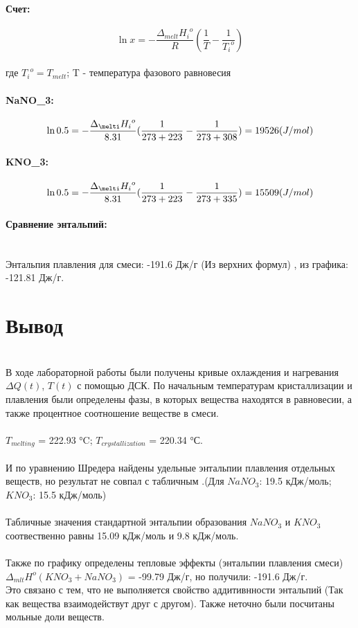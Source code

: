 \documentclass[a4paper,12pt]{article} %
\begin{document}
\paragraph{Счет:}
\begin{equation}
    \ln{x} = -\frac{\Delta_{melt} {H_i}^{o}}{R}(\frac{1}{T}-\frac{1}{{T_i}^{o}}) 
\end{equation}
\\где ${T_i}^{o} = T_{melt}$; T - температура фазового равновесия

\paragraph{{NaNO}_3:}
\begin{equation}
    \ln{0.5} = -\frac{\Delta_{\melti}{H_i}^{o}}{8.31}(\frac{1}{273+223} - \frac{1}{273+308}) = 19526 (J/mol) 
\end{equation}

\paragraph{{KNO}_3:}
\begin{equation}
        \ln{0.5} = -\frac{\Delta_{\melti}{H_i}^{o}}{8.31}(\frac{1}{273+223} - \frac{1}{273+335}) = 15509 (J/mol)
\end{equation}
\paragraph{Сравнение энтальпий:}
\quad \\ Энтальпия плавления для смеси: -191.6 Дж/г (Из верхних формул) , из графика: -121.81 Дж/г.
\section{Вывод}
\quad \\ В ходе лабораторной работы были получены кривые охлаждения и нагревания $\Delta Q(t)$, $T(t)$ с помощью ДСК. По начальным температурам кристаллизации и плавления были определены фазы, в которых вещества находятся в равновесии, а также процентное соотношение веществе в смеси.
\\
\quad \\ $T_{melting}$ = 222.93 °C; $T_{crystallization} $ =  220.34 °С. 
\\
\quad \\ И по уравнению Шредера найдены удельные энтальпии плавления отдельных веществ, но результат не совпал с табличным .(Для ${NaNO}_3$: 19.5 кДж/моль; ${KNO}_3$: 15.5 кДж/моль)
\\
\quad \\Табличные значения стандартной энтальпии образования ${NaNO}_3$ и ${KNO}_3$ соотвественно равны 15.09 кДж/моль и 9.8 кДж/моль.
\\
\quad \\ Также по графику определены тепловые эффекты (энтальпии плавления смеси) ${\Delta_{mlt} H}^{o}({KNO}_3 + {NaNO}_3)$ = -99.79 Дж/г, но получили: -191.6 Дж/г.
\quad \\ Это связано с тем, что не выполняется свойство аддитивнности энтальпий (Так как вещества взаимодействут друг с другом). Также неточно были посчитаны мольные доли веществ.
\end{document}
